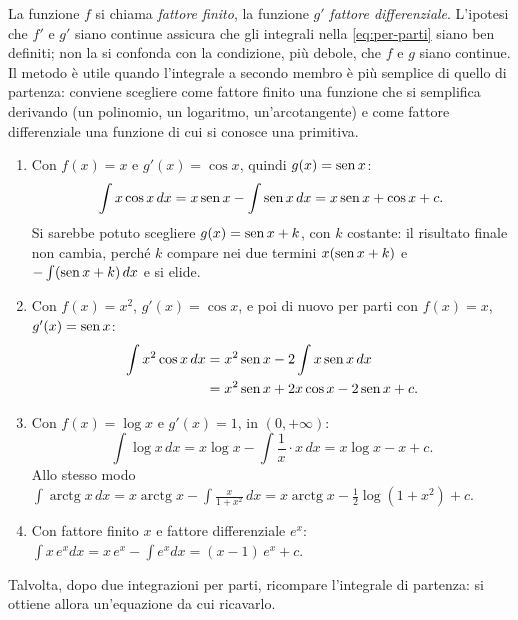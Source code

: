 La funzione $f$ si chiama \emph{fattore finito}, la funzione $g'$ \emph{fattore
differenziale}. L'ipotesi che $f'$ e $g'$ siano continue assicura che gli integrali nella
\eqref{eq:per-parti} siano ben definiti; non la si confonda con la condizione, più debole,
che $f$ e $g$ siano continue. Il metodo è utile quando l'integrale a secondo membro è più
semplice di quello di partenza: conviene scegliere come fattore finito una funzione che
si semplifica derivando (un polinomio, un logaritmo, un'arcotangente) e come fattore
differenziale una funzione di cui si conosce una primitiva.

\begin{esempio}\label{es:per-parti}
\begin{enumerate}[label=\textup{(\alph*)}]
  \item Con $f(x)=x$ e $g'(x)=\cos x$, quindi $g(x)=\operatorname{sen} x$:
  \[
    \int x\cos x\,dx=x\operatorname{sen} x-\int\operatorname{sen} x\,dx=x\operatorname{sen} x+\cos x+c .
  \]
  Si sarebbe potuto scegliere $g(x)=\operatorname{sen} x+k$, con $k$ costante: il risultato finale non
  cambia, perché $k$ compare nei due termini $x(\operatorname{sen} x+k)$ e $-\int(\operatorname{sen} x+k)\,dx$ e si
  elide.
  \item Con $f(x)=x^{2}$, $g'(x)=\cos x$, e poi di nuovo per parti con $f(x)=x$,
  $g'(x)=\operatorname{sen} x$:
  \[
  \begin{aligned}
    \int x^{2}\cos x\,dx&=x^{2}\operatorname{sen} x-2\int x\operatorname{sen} x\,dx\\
    &=x^{2}\operatorname{sen} x+2x\cos x-2\operatorname{sen} x+c .
  \end{aligned}
  \]
  \item Con $f(x)=\log x$ e $g'(x)=1$, in $(0,+\infty)$:
  \begin{equation}\label{eq:integrale-log}
    \int\log x\,dx=x\log x-\int\frac1x\cdot x\,dx=x\log x-x+c .
  \end{equation}
  Allo stesso modo $\int\operatorname{arctg}x\,dx=x\operatorname{arctg}x-\int\frac x{1+x^{2}}\,dx
  =x\operatorname{arctg}x-\frac12\log(1+x^{2})+c$.
  \item Con fattore finito $x$ e fattore differenziale $e^{x}$:
  $\int x\,e^{x}dx=x\,e^{x}-\int e^{x}dx=(x-1)\,e^{x}+c$.
\end{enumerate}
\end{esempio}

Talvolta, dopo due integrazioni per parti, ricompare l'integrale di partenza: si ottiene
allora un'equazione da cui ricavarlo.

